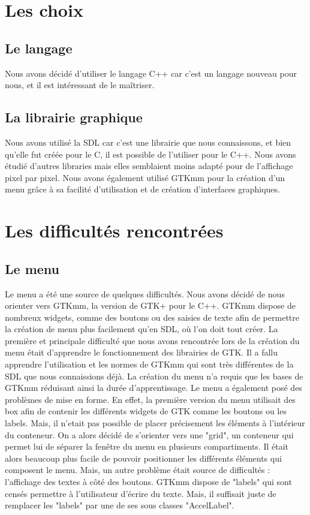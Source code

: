\documentclass{article}
\begin{document}
	\section{Les choix}

	\subsection{Le langage}
	Nous avons décidé d'utiliser le langage C++ car c'est un langage nouveau pour nous, et il est intéressant de le maîtriser.

	\subsection{La librairie graphique}
	Nous avons utilisé la SDL car c'est une librairie que nous connaissons, et bien qu'elle fut créée pour le C, il est possible de l'utiliser pour le C++.
	Nous avons étudié d'autres libraries mais elles semblaient moins adapté pour de l'affichage pixel par pixel.
	Nous avons également utilisé GTKmm pour la création d'un menu grâce à sa facilité d'utilisation et de création d'interfaces graphiques.

	\section{Les difficultés rencontrées}

	\subsection{Le menu}
	Le menu a été une source de quelques difficultés.
	Nous avons décidé de nous orienter vers GTKmm, la version de GTK+ pour le C++.
	GTKmm dispose de nombreux widgets, comme des boutons ou des saisies de texte afin de permettre la création de menu plus facilement qu'en SDL, où l'on doit tout créer.
	La première et principale difficulté que nous avons rencontrée lors de la création du menu était d'apprendre le fonctionnement des librairies de GTK. Il a fallu apprendre l'utilisation et les normes de GTKmm qui sont très différentes de la SDL que nous connaissions déjà.
	La création du menu n'a requis que les bases de GTKmm réduisant ainsi la durée d'apprentissage.
	Le menu a également posé des problèmes de mise en forme.
	En effet, la première version du menu utilisait des box afin de contenir les différents widgets de GTK comme les boutons ou les labels.
	Mais, il n'etait pas possible de placer précisement les éléments à l'intérieur du conteneur.
	On a alors décidé de s'orienter vers une "grid", un conteneur qui permet lui de séparer la fenêtre du menu en plusieurs compartiments.
	Il était alors beaucoup plus facile de pouvoir positionner les différents éléments qui composent le menu.
	Mais, un autre problème était source de difficultés : l'affichage des textes à côté des boutons.
	GTKmm dispose de "labels" qui sont censés permettre à l'utilisateur d'écrire du texte.
	Mais, il suffisait juste de remplacer les "labels" par une de ses sous classes "AccelLabel".
\end{document}
